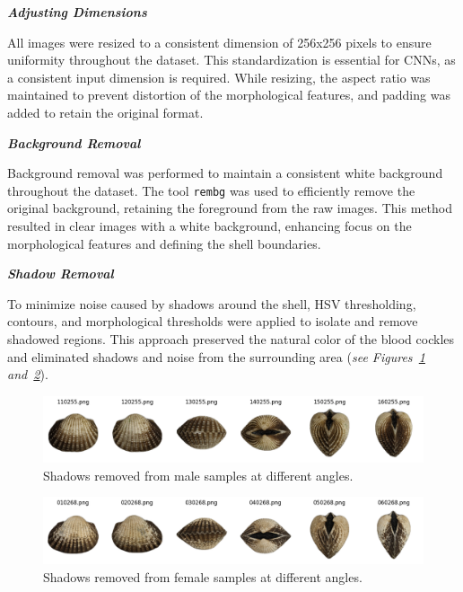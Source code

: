 \textbf{\textit{Adjusting Dimensions}}

All images were resized to a consistent dimension of 256x256 pixels to ensure uniformity throughout the dataset. This standardization is essential for CNNs, as a consistent input dimension is required. While resizing, the aspect ratio was maintained to prevent distortion of the morphological features, and padding was added to retain the original format.

\textbf{\textit{Background Removal}}

Background removal was performed to maintain a consistent white background throughout the dataset. The tool \texttt{rembg} was used to efficiently remove the original background, retaining the foreground from the raw images. This method resulted in clear images with a white background, enhancing focus on the morphological features and defining the shell boundaries.

\textbf{\textit{Shadow Removal}}

To minimize noise caused by shadows around the shell, HSV thresholding, contours, and morphological thresholds were applied to isolate and remove shadowed regions. This approach preserved the natural color of the blood cockles and eliminated shadows and noise from the surrounding area (\textit{see Figures~\ref{fig:m_noshadow} and~\ref{fig:f_noshadow}}).

\begin{figure}[h]
	\centering
	\includegraphics[width=\textwidth]{figures/male_shadows_removed.png}
	\caption{Shadows removed from male samples at different angles.}
	\label{fig:m_noshadow}
\end{figure}

\begin{figure}[h]
	\centering
	\includegraphics[width=\textwidth]{figures/female_shadows_removed.png}
	\caption{Shadows removed from female samples at different angles.}
	\label{fig:f_noshadow}
\end{figure}

